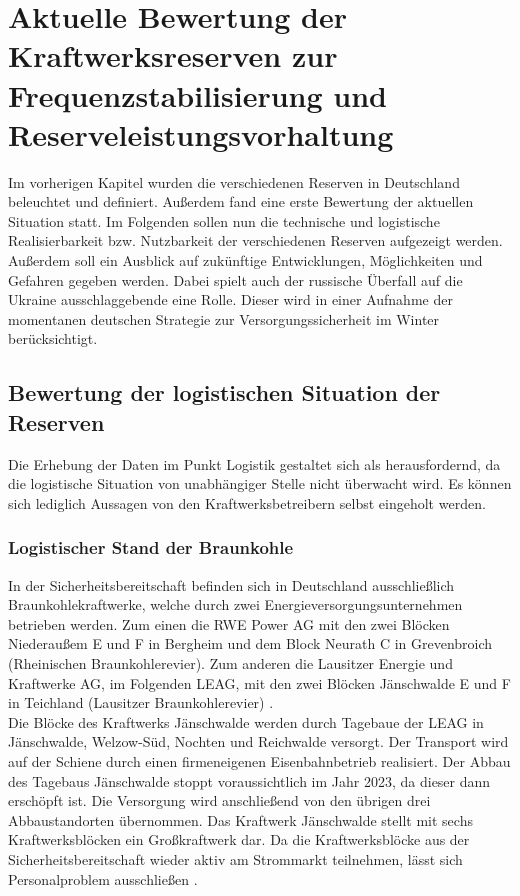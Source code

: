 \section{Aktuelle Bewertung der Kraftwerksreserven zur Frequenzstabilisierung und Reserveleistungsvorhaltung} \label{sect: Aktuelle Bewertung der Kraftwerksreserven zur Frequenzstabilisierung und Reserveleistungsvorhaltung}

	Im vorherigen Kapitel wurden die verschiedenen Reserven in Deutschland beleuchtet und definiert. 
	Außerdem fand eine erste Bewertung der aktuellen Situation statt. Im Folgenden sollen nun die technische und logistische Realisierbarkeit bzw. Nutzbarkeit der verschiedenen Reserven aufgezeigt werden. 
	Außerdem soll ein Ausblick auf zukünftige Entwicklungen, Möglichkeiten und Gefahren gegeben werden. 
	Dabei spielt auch der russische Überfall auf die Ukraine ausschlaggebende eine Rolle. 
	Dieser wird in einer Aufnahme der momentanen deutschen Strategie zur Versorgungssicherheit im Winter berücksichtigt.

	\subsection{Bewertung der logistischen Situation der Reserven}
	
		Die Erhebung der Daten im Punkt Logistik gestaltet sich als herausfordernd, da die logistische Situation von unabhängiger Stelle nicht überwacht wird. 
		Es können sich lediglich Aussagen von den Kraftwerksbetreibern selbst eingeholt werden.
	
		\subsubsection{Logistischer Stand der Braunkohle} \label{sect: Braunkohle}
		
			In der Sicherheitsbereitschaft befinden sich in Deutschland ausschließlich Braunkohlekraftwerke, welche durch zwei Energieversorgungsunternehmen betrieben werden.
			Zum einen die RWE Power AG mit den zwei Blöcken Niederaußem E und F in Bergheim und dem Block Neurath C in Grevenbroich (Rheinischen Braunkohlerevier).
			Zum anderen die Lausitzer Energie und Kraftwerke AG, im Folgenden LEAG, mit den zwei Blöcken Jänschwalde E und F in Teichland (Lausitzer Braunkohlerevier) \cite{Excel_Kraftwerksliste}. \\
	
			Die Blöcke des Kraftwerks Jänschwalde werden durch Tagebaue der LEAG in Jänschwalde, Welzow-Süd, Nochten und Reichwalde versorgt. 
			Der Transport wird auf der Schiene durch einen firmeneigenen Eisenbahnbetrieb realisiert. 
			Der Abbau des Tagebaus Jänschwalde stoppt voraussichtlich im Jahr 2023, da dieser dann erschöpft ist. 
			Die Versorgung wird anschließend von den übrigen drei Abbaustandorten übernommen.
			Das Kraftwerk Jänschwalde stellt mit sechs Kraftwerksblöcken ein Großkraftwerk dar.
			Da die Kraftwerksblöcke aus der Sicherheitsbereitschaft wieder aktiv am Strommarkt teilnehmen, lässt sich Personalproblem ausschließen \cite{LEAG_Braunkohleversorgung}. \\
			
